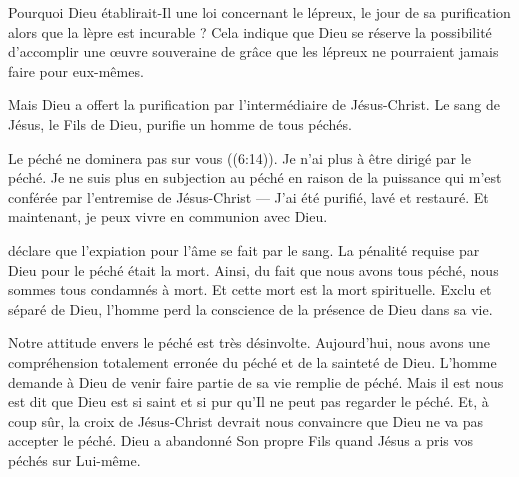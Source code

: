 Pourquoi Dieu établirait-Il une loi concernant le lépreux,
 le jour de sa purification alors que la lèpre est incurable ?
 Cela indique que Dieu se réserve la possibilité d'accomplir
 une œuvre souveraine de grâce que les lépreux ne pourraient
 jamais faire pour eux-mêmes. 


Mais Dieu a offert la purification par l'intermédiaire de Jésus-Christ.
 Le sang de Jésus, le Fils de Dieu, purifie un homme de tous péchés. 

\og Le péché ne dominera pas sur vous \fg{} ((6:14)).
 Je n'ai plus à être dirigé par le péché.
 Je ne suis plus en subjection au péché en raison de la puissance
 qui m'est conférée par l'entremise de Jésus-Christ
 --- J'ai été purifié, lavé et restauré.
 Et maintenant, je peux vivre en communion avec Dieu. 

\dvrule






 déclare que l'expiation
 pour l'âme se fait par le sang.
 La pénalité requise par Dieu pour le péché était la mort.
 Ainsi, du fait que nous avons tous péché,
 nous sommes tous condamnés à mort.
 Et cette mort est la mort spirituelle. Exclu et séparé de Dieu,
 l'homme perd la conscience de la présence de Dieu dans sa vie. 

Notre attitude envers le péché est très désinvolte.
 Aujourd'hui, nous avons une compréhension totalement erronée du péché
 et de la sainteté de Dieu.
 L'homme demande à Dieu de venir faire partie de sa vie remplie de péché.
 Mais il est nous est dit que Dieu est si saint et si pur
 qu'Il ne peut pas regarder le péché.
 Et, à coup sûr, la croix de Jésus-Christ devrait nous convaincre
 que Dieu ne va pas accepter le péché.
 Dieu a abandonné Son propre Fils quand Jésus a pris vos péchés
 sur Lui-même.

